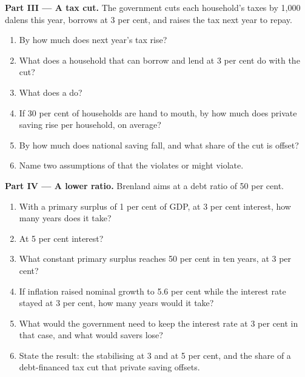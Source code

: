 \begin{problem}
\medskip
\noindent\textbf{Part III --- A tax cut.} The government cuts each household's taxes by 1,000 dalens this year, borrows at 3 per
cent, and raises the tax next year to repay.
\begin{enumerate}[resume]
  \item By how much does next year's tax rise?
  \item What does a household that can borrow and lend at 3 per cent do with the cut?
  \item What does a  do?
  \item If 30 per cent of households are hand to mouth, by how much does private saving rise per household, on average?
  \item By how much does national saving fall, and what share of the cut is offset?
  \item Name two assumptions of  that the  violates or might violate.
\end{enumerate}

\medskip
\noindent\textbf{Part IV --- A lower ratio.} Brenland aims at a debt ratio of 50 per cent.
\begin{enumerate}[resume]
  \item With a primary surplus of 1 per cent of GDP, at 3 per cent interest, how many years does it take?
  \item At 5 per cent interest?
  \item What constant primary surplus reaches 50 per cent in ten years, at 3 per cent?
  \item If inflation raised nominal growth to 5.6 per cent while the interest rate stayed at 3 per cent, how many years would it take?
  \item What would the government need to keep the interest rate at 3 per cent in that case, and what would savers lose?
  \item State the result: the stabilising  at 3 and at 5 per cent, and the share of a debt-financed tax cut
    that private saving offsets.
\end{enumerate}
\end{problem}

